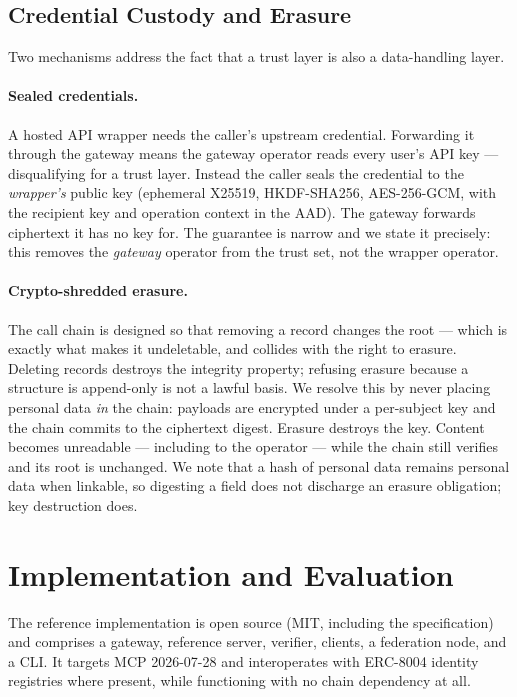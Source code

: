 \documentclass[11pt]{article}
\begin{document}
\subsection{Credential Custody and Erasure}

Two mechanisms address the fact that a trust layer is also a data-handling layer.

\paragraph{Sealed credentials.} A hosted API wrapper needs the caller's upstream
credential. Forwarding it through the gateway means the gateway operator reads
every user's API key --- disqualifying for a trust layer. Instead the caller
seals the credential to the \emph{wrapper's} public key (ephemeral X25519,
HKDF-SHA256, AES-256-GCM, with the recipient key and operation context in the
AAD). The gateway forwards ciphertext it has no key for. The guarantee is narrow
and we state it precisely: this removes the \emph{gateway} operator from the
trust set, not the wrapper operator.

\paragraph{Crypto-shredded erasure.} The call chain is designed so that removing
a record changes the root --- which is exactly what makes it undeletable, and
collides with the right to erasure. Deleting records destroys the integrity
property; refusing erasure because a structure is append-only is not a lawful
basis. We resolve this by never placing personal data \emph{in} the chain:
payloads are encrypted under a per-subject key and the chain commits to the
ciphertext digest. Erasure destroys the key. Content becomes unreadable ---
including to the operator --- while the chain still verifies and its root is
unchanged. We note that a hash of personal data remains personal data when
linkable, so digesting a field does not discharge an erasure obligation; key
destruction does.

\section{Implementation and Evaluation}\label{sec:eval}

The reference implementation is open source (MIT, including the specification)
and comprises a gateway, reference server, verifier, clients, a federation node,
and a CLI. It targets MCP 2026-07-28 and interoperates with ERC-8004 identity
registries where present, while functioning with no chain dependency at all.
\end{document}
